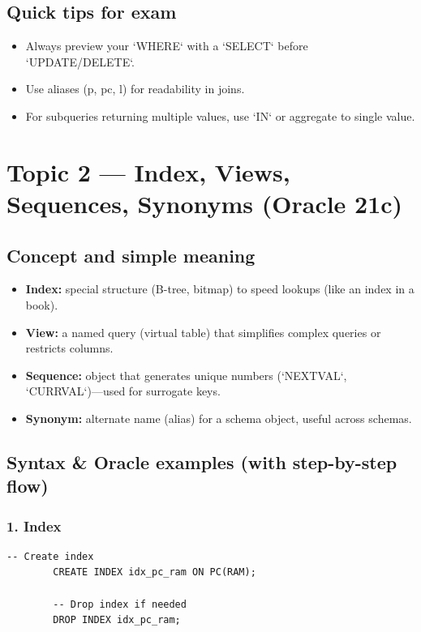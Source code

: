 \documentclass[11pt,a4paper]{article}
\begin{document}
	\subsection{Quick tips for exam}
	\begin{itemize}[noitemsep]
		\item Always preview your `WHERE` with a `SELECT` before `UPDATE/DELETE`.  
		\item Use aliases (p, pc, l) for readability in joins.  
		\item For subqueries returning multiple values, use `IN` or aggregate to single value.  
	\end{itemize}
	
	\newpage
	\section{Topic 2 — Index, Views, Sequences, Synonyms (Oracle 21c)}
	\subsection{Concept and simple meaning}
	\begin{itemize}[noitemsep]
		\item \textbf{Index:} special structure (B-tree, bitmap) to speed lookups (like an index in a book).  
		\item \textbf{View:} a named query (virtual table) that simplifies complex queries or restricts columns.  
		\item \textbf{Sequence:} object that generates unique numbers (`NEXTVAL`, `CURRVAL`)—used for surrogate keys.  
		\item \textbf{Synonym:} alternate name (alias) for a schema object, useful across schemas.
	\end{itemize}
	
	\subsection{Syntax \& Oracle examples (with step-by-step flow)}
	
	\subsubsection*{1. Index}
	\begin{lstlisting}[caption={Create an index on PC.RAM}]
		-- Create index
		CREATE INDEX idx_pc_ram ON PC(RAM);
		
		-- Drop index if needed
		DROP INDEX idx_pc_ram;
	\end{lstlisting}
	
\end{document}
